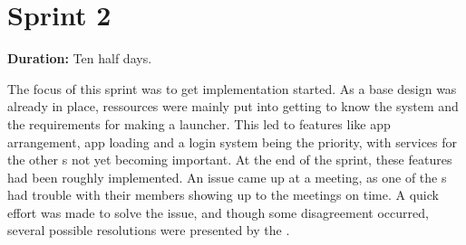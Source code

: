 \section{Sprint 2}%

\textbf{Duration:} Ten half days. \newline

The focus of this sprint was to get implementation started. 
As a base design was already in place, ressources were mainly put into getting to know the system and the requirements for making a launcher. 
This led to features like app arrangement, app loading and a login system being the priority, with services for the other \localgroup{}s not yet becoming important. 
At the end of the sprint, these features had been roughly implemented. \newline
An issue came up at a meeting, as one of the \localgroup{}s had trouble with their members showing up to the meetings on time. 
A quick effort was made to solve the issue, and though some disagreement occurred, several possible resolutions were presented by the \globalgroup{}.